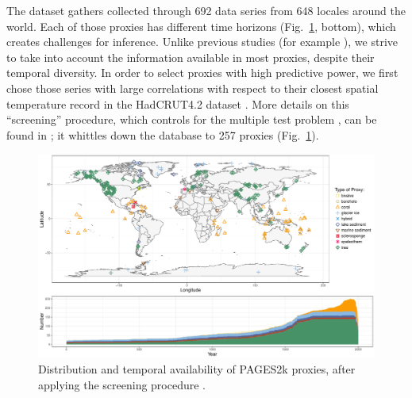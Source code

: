 \documentclass[12pt]{amsart}
\theoremstyle{plain}
\theoremstyle{definition}
\theoremstyle{remark}
\begin{document}
The dataset gathers collected through 692
data series from 648 locales around the world. Each of those proxies
has different time horizons (Fig.~\ref{fig:proxy}, bottom), which creates challenges for inference. Unlike previous studies (for example \cite{Barboza2014}), we strive to take into account the information available in most proxies, despite their temporal diversity.
In order to select proxies with high predictive power, we first chose those series with large correlations with respect to
their closest spatial temperature record in the HadCRUT4.2 dataset \citep{Morice2012}. More
details on this ``screening'' procedure, which controls for the multiple test problem \citep{BenjaminiHochberg95}, can be found in \citep{PAGES2kSD2017allauthors}; it whittles down the database to 257 proxies (Fig.~\ref{fig:proxy}).   
\begin{figure}
  \centering
  \includegraphics[scale=0.40]{CombinedMap_Area}
  \caption{Distribution and temporal availability of PAGES2k proxies, after applying the screening procedure \cite{PAGES2kSD2017allauthors}.}
  \label{fig:proxy}
\end{figure}
\end{document}
